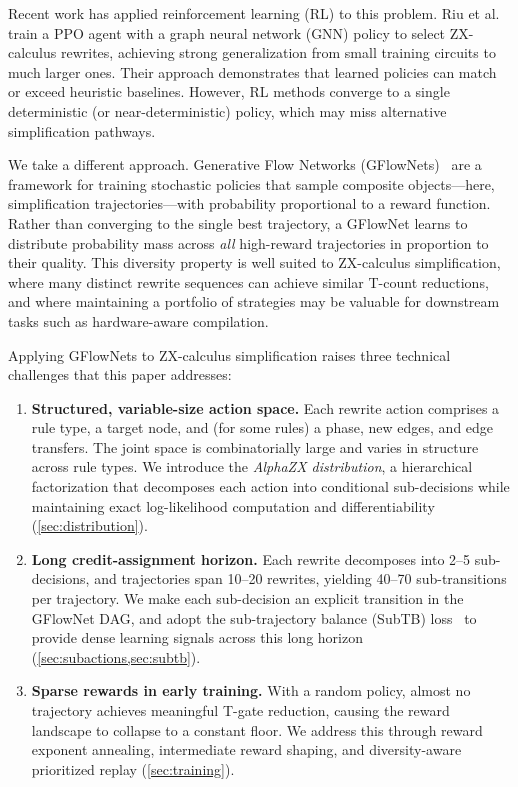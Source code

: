 \documentclass[11pt,a4paper]{article}
\begin{document}
Recent work has applied reinforcement learning (RL) to this problem.
Riu et al.~\cite{riu2025rl} train a PPO agent with a graph neural
network (GNN) policy to select ZX-calculus rewrites, achieving strong
generalization from small training circuits to much larger ones.  Their
approach demonstrates that learned policies can match or exceed
heuristic baselines.  However, RL methods converge to a single
deterministic (or near-deterministic) policy, which may miss alternative
simplification pathways.

We take a different approach.  Generative Flow Networks
(GFlowNets)~\cite{bengio2021flow} are a framework for training
stochastic policies that sample composite objects---here, simplification
trajectories---with probability proportional to a reward function.
Rather than converging to the single best trajectory, a GFlowNet learns
to distribute probability mass across \emph{all} high-reward
trajectories in proportion to their quality.  This diversity property is
well suited to ZX-calculus simplification, where many distinct rewrite
sequences can achieve similar T-count reductions, and where maintaining a
portfolio of strategies may be valuable for downstream tasks such as
hardware-aware compilation.

Applying GFlowNets to ZX-calculus simplification raises three technical
challenges that this paper addresses:

\begin{enumerate}
\item \textbf{Structured, variable-size action space.}  Each rewrite
action comprises a rule type, a target node, and (for some rules) a
phase, new edges, and edge transfers.  The joint space is combinatorially
large and varies in structure across rule types.  We introduce the
\emph{AlphaZX distribution}, a hierarchical factorization that decomposes
each action into conditional sub-decisions while maintaining exact
log-likelihood computation and differentiability
(\cref{sec:distribution}).

\item \textbf{Long credit-assignment horizon.}  Each rewrite decomposes
into 2--5 sub-decisions, and trajectories span 10--20 rewrites, yielding
40--70 sub-transitions per trajectory.  We make each sub-decision an
explicit transition in the GFlowNet DAG, and adopt the sub-trajectory
balance (SubTB) loss~\cite{madan2023subtb} to provide dense learning
signals across this long horizon (\cref{sec:subactions,sec:subtb}).

\item \textbf{Sparse rewards in early training.}  With a random policy,
almost no trajectory achieves meaningful T-gate reduction, causing the
reward landscape to collapse to a constant floor.  We address this
through reward exponent annealing, intermediate reward shaping, and
diversity-aware prioritized replay (\cref{sec:training}).
\end{enumerate}
\end{document}
